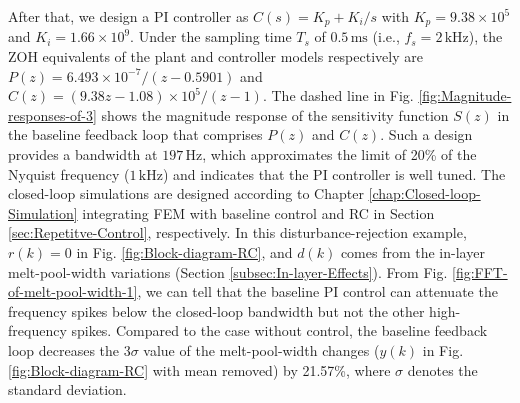 \documentclass [11pt, proquest] {uwthesis}[2020/02/24]
\begin{document}
After that, we design a PI controller as $C(s)=K_{p}+K_{i}/s$ with
$K_{p}=9.38\times10^{5}$ and $K_{i}=1.66\times10^{9}$. Under the
sampling time $T_{s}$ of $0.5\,\text{ms}$ (i.e., $f_{s}=2\,\text{kHz}$),
the ZOH equivalents of the plant and controller models
respectively are $P(z)=6.493\times10^{-7}/(z-0.5901)$ and $C(z)=(9.38z-1.08)\times10^{5}/(z-1)$.
The dashed line in Fig. \ref{fig:Magnitude-responses-of-3} shows the
magnitude response of the sensitivity function $S(z)$ in the baseline
feedback loop that comprises $P(z)$ and $C(z)$. Such a design provides
a bandwidth at $197\,\text{Hz}$, which approximates the limit of
20\% of the Nyquist frequency ($1\,\text{kHz}$) and indicates that
the PI controller is well tuned. The closed-loop simulations are designed
according to Chapter \ref{chap:Closed-loop-Simulation} integrating
FEM with baseline control and RC in Section \ref{sec:Repetitve-Control}, respectively. In this disturbance-rejection
example, $r(k)=0$ in Fig. \ref{fig:Block-diagram-RC}, and $d(k)$
comes from the in-layer melt-pool-width variations (Section \ref{subsec:In-layer-Effects}).
From Fig. \ref{fig:FFT-of-melt-pool-width-1}, we can tell that the
baseline PI control can attenuate the frequency spikes below the closed-loop
bandwidth but not the other high-frequency spikes. Compared to the
case without control, the baseline feedback loop decreases the $3\sigma$
value of the melt-pool-width changes ($y(k)$ in Fig. \ref{fig:Block-diagram-RC}
with mean removed) by 21.57\%, where $\sigma$ denotes the standard
deviation.
\end{document}
